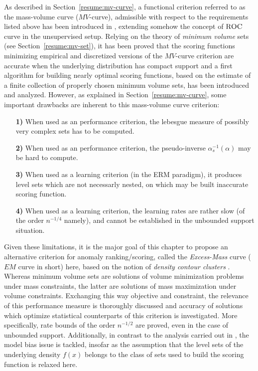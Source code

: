 As described in Section~\ref{resume:mv-curve}, a functional criterion referred to as the mass-volume curve ($MV$-curve), admissible with respect to the requirements listed above has been introduced in \cite{CLEM13}, extending somehow the concept of $\textsc{ROC}$ curve in the unsupervised setup. Relying on the theory of \textit{minimum volume} sets (see Section~\ref{resume:mv-set}), it has been proved that the scoring functions minimizing empirical and discretized versions of the $MV$-curve criterion are accurate when the underlying distribution has compact support and a first algorithm for building nearly optimal scoring functions, based on the estimate of a finite collection of properly chosen minimum volume sets, has been introduced and analyzed. 
However, as explained in Section~\ref{resume:mv-curve}, some important drawbacks are inherent to this mass-volume curve criterion:
\begin{itemize}
\item[\textbf{1)}] When used as an performance criterion, the lebesgue measure of possibly very complex sets has to be computed.
\item[\textbf{2)}] When used as an performance criterion, the pseudo-inverse $\alpha_s^{-1}(\alpha)$ may be hard to compute.
\item[\textbf{3)}] When used as a learning criterion (in the ERM paradigm), it produces level sets which are not necessarly nested, on which may be built inaccurate scoring function. 
\item[\textbf{4)}] When used as a learning criterion, the learning rates are rather slow (of the order $n^{-1/4}$ namely), and cannot be established in the unbounded support situation.
\end{itemize}
 Given these limitations, it is the major goal of this chapter to propose an alternative criterion for anomaly ranking/scoring, called the \textit{Excess-Mass} curve ($EM$ curve in short) here, based on the notion of {\it density contour clusters}  \cite{Polonik95,Hartigan1987,Muller1991}. Whereas minimum volume sets are solutions of volume minimization problems under mass constraints, the latter are solutions of mass maximization under volume constraints. Exchanging this way objective and constraint, the relevance of this performance measure is thoroughly discussed and accuracy of solutions which optimize statistical counterparts of this criterion is
investigated. More specifically, rate bounds of the order $n^{-1/2}$ are proved, even in the case of unbounded support. Additionally, in contrast to the analysis carried out in \cite{CLEM13}, the model bias issue is tackled,
insofar as the assumption that the level sets of the underlying
density $f(x)$ belongs to the class of sets used to build the scoring
function is relaxed here. 

